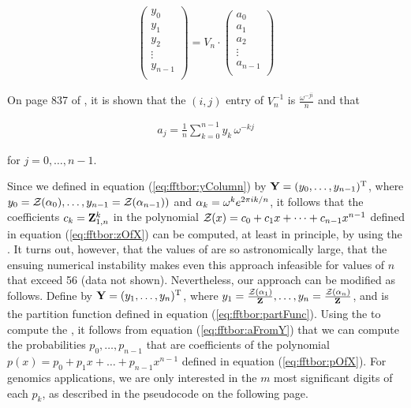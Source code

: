 \begin{align}
\label{eq:fftbor:dftMatrix}
\left(
\begin{array}{l}
y_0 \\
y_1 \\
y_2 \\
\vdots \\
y_{n-1} \\
\end{array}
\right)
= V_n \cdot
\left(
\begin{array}{l}
a_0 \\
a_1 \\
a_2 \\
\vdots \\
a_{n-1} \\
\end{array}
\right)
\end{align}

On page 837 of \cite{cormen}, it is shown that the
$(i,j)$ entry of $V_n^{-1}$ is $\frac{\omega^{-j i}}{n}$
and that

\begin{align}
\label{eq:fftbor:aFromY}
a_j = \frac{1}{n} \sum_{k=0}^{n-1} y_k\,\omega^{-kj}
\end{align}

for $j=0,\dots,n-1$.

Since we defined \bfY in equation (\ref{eq:fftbor:yColumn}) by ${\bf Y} =
(y_0,\dots,y_{n-1})^{\text T}$, where
$y_0={\mathcal Z}_{}(\alpha_0),\dots,y_{n-1}={\mathcal Z}_{}(\alpha_{n-1}))$
and $\alpha_k = \omega^k e^{2 \pi i k/n}$, it follows that the coefficients
$c_k={\bf Z}^{k}_{1,n}$ in the polynomial
${\mathcal Z}_{}(x) = c_0 + c_1 x + \dots + c_{n-1} x^{n-1}$ defined in equation
(\ref{eq:fftbor:zOfX}) can be computed, at least in principle,
by using the \fft. It turns out, however, that the values of
 are so astronomically large, that the ensuing numerical
instability makes even this approach infeasible for values of $n$
that exceed 56 (data not shown).
Nevertheless, our approach can be modified as follows.
Define \bfY by ${\bf Y} = (y_1,\dots,y_n)^{\text T}$, where
$y_1=\frac{{\mathcal Z}_{}(\alpha_1)}{{\bf Z}^{}_{}},\dots,
y_{n}=\frac{{\mathcal Z}_{}(\alpha_n)}{{\bf Z}^{}_{}}$, and
\bfZ{}{} is the partition function defined in equation (\ref{eq:fftbor:partFunc}).
Using the \fft to compute the \idft, it follows from equation
(\ref{eq:fftbor:aFromY}) that we can compute the probabilities $p_0,\dots,p_{n-1}$
that are coefficients of the polynomial
$p(x) = p_0 + p_1 x + \dots + p_{n-1}x^{n-1}$
defined in equation (\ref{eq:fftbor:pOfX}). For genomics applications, we are
only interested in the $m$ most significant digits of each $p_k$, as described
in the pseudocode on the following page.
\medskip

